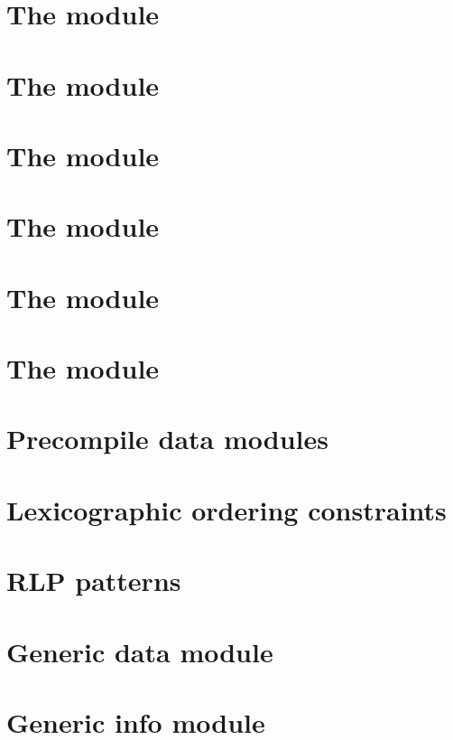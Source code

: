 \documentclass[fleqn]{report}
\begin{document}
\chapter{The \rlpTxnMod{} module}                    \label{chap: txn rlp}         \minitoc    
\chapter{The \txnDataMod{} module}                   \label{chap: txn data}        \minitoc    
\chapter{The \rlpAddrMod{} module}                   \label{chap: addr rlp}        \minitoc    
\chapter{The \rlpTxnRcptMod{} module}                \label{chap: log rlp}         \minitoc    
\chapter{The \logInfoMod{} module}                   \label{chap: log info}        \minitoc    
\chapter{The \logDataMod{} module}                   \label{chap: log data}        \minitoc    
\chapter{Precompile data modules}                    \label{chap: precompile data} \minitoc    

\appendix
\chapter{Lexicographic ordering constraints}         \label{chap: lex}             \minitoc    
\chapter{RLP patterns}                               \label{chap: RLP patterns}    \minitoc    
\chapter{Generic data module}                        \label{chap: generic data}    \minitoc    
\chapter{Generic info module}                        \label{chap: generic info}    \minitoc    

\nocite{*}

\printbibliography %
\end{document}
